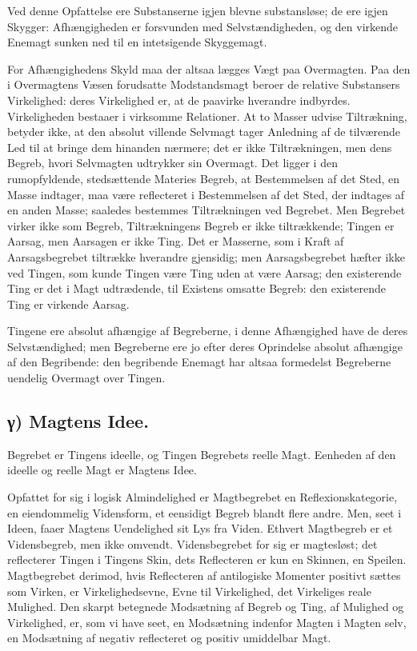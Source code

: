 \documentclass[12pt]{book}
\newcommand{\opage}[1]{\marginnote{\footnotesize\textit{[#1]}}}
\begin{document}
Ved denne Opfattelse ere Substanserne igjen blevne
substansløse; de ere igjen Skygger: Afhængigheden er
forsvunden med Selvstændigheden, og den virkende Enemagt sunken
ned til en intetsigende Skyggemagt.

For Afhængighedens Skyld maa der altsaa lægges Vægt
paa Overmagten. Paa den i Overmagtens Væsen forudsatte
Modstandsmagt beroer de relative Substansers Virkelighed:
deres Virkelighed er, at de paavirke hverandre indbyrdes.
Virkeligheden bestaaer i virksomme Relationer. At to Masser
udvise Tiltrækning, betyder ikke, at den absolut villende Selvmagt
tager Anledning af de tilværende Led til at bringe dem
hinanden nærmere; det er ikke Tiltrækningen, men dens Begreb,
hvori Selvmagten udtrykker sin Overmagt. Det ligger i den
rumopfyldende, stedsættende Materies Begreb, at Bestemmelsen
af det Sted, en Masse indtager, maa være reflecteret i
Bestemmelsen af det Sted, der indtages af en anden Masse;
saaledes bestemmes Tiltrækningen ved Begrebet. Men
Begrebet virker ikke som Begreb, Tiltrækningens Begreb er ikke
tiltrækkende; Tingen er Aarsag, men Aarsagen er ikke Ting.
Det er Masserne, som i Kraft af Aarsagsbegrebet tiltrække
hverandre gjensidig; men Aarsagsbegrebet hæfter ikke ved
Tingen, som kunde Tingen være Ting uden at være
Aarsag; den existerende Ting er det i Magt udtrædende, til
Existens omsatte Begreb: den existerende Ting er virkende
Aarsag.

Tingene ere absolut afhængige af Begreberne, i denne
Afhængighed have de deres Selvstændighed; men Begreberne
ere jo efter deres Oprindelse absolut afhængige af den
Begribende: den begribende Enemagt har altsaa formedelst
Begreberne uendelig Overmagt over Tingen.

\subsection*{γ) Magtens Idee.}

Begrebet er Tingens ideelle, og
\opage{42} Tingen Begrebets reelle Magt. Eenheden af den ideelle og
reelle Magt er Magtens Idee.

Opfattet for sig i logisk Almindelighed er Magtbegrebet
en Reflexionskategorie, en eiendommelig Vidensform, et
eensidigt Begreb blandt flere andre. Men, seet i Ideen, faaer
Magtens Uendelighed sit Lys fra Viden. Ethvert
Magtbegreb er et Vidensbegreb, men ikke omvendt.
Vidensbegrebet for sig er magtesløst; det reflecterer Tingen i Tingens
Skin, dets Reflecteren er kun en Skinnen, en Speilen.
Magtbegrebet derimod, hvis Reflecteren af antilogiske
Momenter positivt sættes som Virken, er Virkelighedsevne, Evne
til Virkelighed, det Virkeliges reale Mulighed. Den skarpt
betegnede Modsætning af Begreb og Ting, af Mulighed og
Virkelighed, er, som vi have seet, en Modsætning indenfor
Magten i Magten selv, en Modsætning af negativ reflecteret
og positiv umiddelbar Magt.
\end{document}
